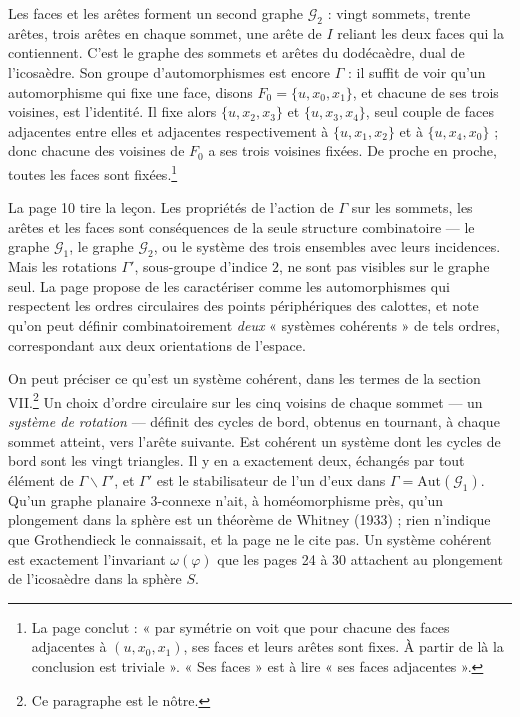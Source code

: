 \documentclass[11pt,a4paper]{article}
\begin{document}
Les faces et les arêtes forment un second graphe $\mathcal{G}_2$ : vingt
sommets, trente arêtes, trois arêtes en chaque sommet, une arête de $I$
reliant les deux faces qui la contiennent. C'est le graphe des sommets et
arêtes du dodécaèdre, dual de l'icosaèdre. Son groupe d'automorphismes est
encore $\Gamma$ : il suffit de voir qu'un automorphisme qui fixe une face,
disons $F_0 = \{u, x_0, x_1\}$, et chacune de ses trois voisines, est
l'identité. Il fixe alors $\{u, x_2, x_3\}$ et $\{u, x_3, x_4\}$, seul couple
de faces adjacentes entre elles et adjacentes respectivement à
$\{u, x_1, x_2\}$ et à $\{u, x_4, x_0\}$ ; donc chacune des voisines de $F_0$
a ses trois voisines fixées. De proche en proche, toutes les faces sont
fixées.\footnote{La page conclut : « par symétrie on voit que pour chacune
des faces adjacentes à $(u, x_0, x_1)$, ses faces et leurs arêtes sont
fixes. À partir de là la conclusion est triviale ». « Ses faces » est à lire
« ses faces adjacentes ».}

La page 10 tire la leçon. Les propriétés de l'action de $\Gamma$ sur les
sommets, les arêtes et les faces sont conséquences de la seule structure
combinatoire --- le graphe $\mathcal{G}_1$, le graphe $\mathcal{G}_2$, ou le
système des trois ensembles avec leurs incidences. Mais les rotations
$\Gamma'$, sous-groupe d'indice $2$, ne sont pas visibles sur le graphe seul.
La page propose de les caractériser comme les automorphismes qui respectent
les ordres circulaires des points périphériques des calottes, et note qu'on
peut définir combinatoirement \emph{deux} « systèmes cohérents » de tels
ordres, correspondant aux deux orientations de l'espace.

On peut préciser ce qu'est un système cohérent, dans les termes de la
section VII.\footnote{Ce paragraphe est le nôtre.} Un choix d'ordre
circulaire sur les cinq voisins de chaque sommet --- un \emph{système de
rotation} --- définit des cycles de bord, obtenus en tournant, à chaque
sommet atteint, vers l'arête suivante. Est cohérent un système dont les
cycles de bord sont les vingt triangles. Il y en a exactement deux,
échangés par tout élément de $\Gamma \smallsetminus \Gamma'$, et $\Gamma'$ est
le stabilisateur de l'un d'eux dans $\Gamma = \mathrm{Aut}(\mathcal{G}_1)$.
Qu'un graphe planaire $3$-connexe n'ait, à homéomorphisme près, qu'un
plongement dans la sphère est un théorème de Whitney (1933) ; rien n'indique
que Grothendieck le connaissait, et la page ne le cite pas. Un système
cohérent est exactement l'invariant $\omega(\varphi)$ que les pages 24 à 30
attachent au plongement de l'icosaèdre dans la sphère $S$.
\end{document}
